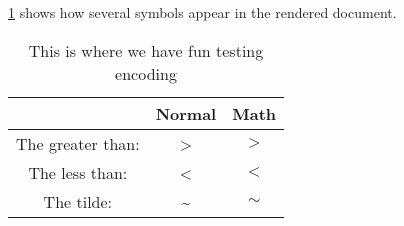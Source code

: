 \label{app:encoding}
\ref{tab:encoding} shows how several symbols appear in the rendered document.

\begin{table}[H]
	\caption{\label{tab:encoding}This is where we have fun testing encoding}
	\begin{center}
		\begin{tabular}{|c|c|c|}
			\hline
			& Normal & Math \\
			\hline
			The greater than: & > & $>$ \\
			\hline
			The less than: & < & $<$ \\
			\hline
			The tilde: & \textasciitilde{} & $\sim$ \\
			\hline
		\end{tabular}
	\end{center}
\end{table}

